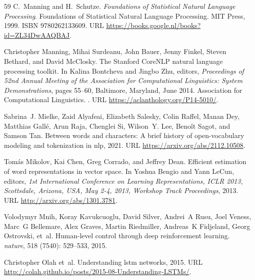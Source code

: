 \begin{thebibliography}{59}
C.~Manning and H.~Schutze.
\newblock \emph{Foundations of Statistical Natural Language Processing}.
\newblock Foundations of Statistical Natural Language Processing. MIT Press, 1999.
\newblock ISBN 9780262133609.
\newblock URL \url{https://books.google.nl/books?id=ZL34DwAAQBAJ}.

Christopher Manning, Mihai Surdeanu, John Bauer, Jenny Finkel, Steven Bethard, and David McClosky.
\newblock The {S}tanford {C}ore{NLP} natural language processing toolkit.
\newblock In Kalina Bontcheva and Jingbo Zhu, editors, \emph{Proceedings of 52nd Annual Meeting of the Association for Computational Linguistics: System Demonstrations}, pages 55--60, Baltimore, Maryland, June 2014. Association for Computational Linguistics.
\newblock {}.
\newblock URL \url{https://aclanthology.org/P14-5010/}.

Sabrina~J. Mielke, Zaid Alyafeai, Elizabeth Salesky, Colin Raffel, Manan Dey, Matthias Gallé, Arun Raja, Chenglei Si, Wilson~Y. Lee, Benoît Sagot, and Samson Tan.
\newblock Between words and characters: A brief history of open-vocabulary modeling and tokenization in nlp, 2021.
\newblock URL \url{https://arxiv.org/abs/2112.10508}.

Tom{\'{a}}s Mikolov, Kai Chen, Greg Corrado, and Jeffrey Dean.
\newblock Efficient estimation of word representations in vector space.
\newblock In Yoshua Bengio and Yann LeCun, editors, \emph{1st International Conference on Learning Representations, {ICLR} 2013, Scottsdale, Arizona, USA, May 2-4, 2013, Workshop Track Proceedings}, 2013.
\newblock URL \url{http://arxiv.org/abs/1301.3781}.

Volodymyr Mnih, Koray Kavukcuoglu, David Silver, Andrei~A Rusu, Joel Veness, Marc~G Bellemare, Alex Graves, Martin Riedmiller, Andreas~K Fidjeland, Georg Ostrovski, et~al.
\newblock Human-level control through deep reinforcement learning.
\newblock \emph{nature}, 518 (7540): 529--533, 2015.

Christopher Olah et~al.
\newblock Understanding lstm networks, 2015.
\newblock URL \url{http://colah.github.io/posts/2015-08-Understanding-LSTMs/}.


\end{thebibliography}
